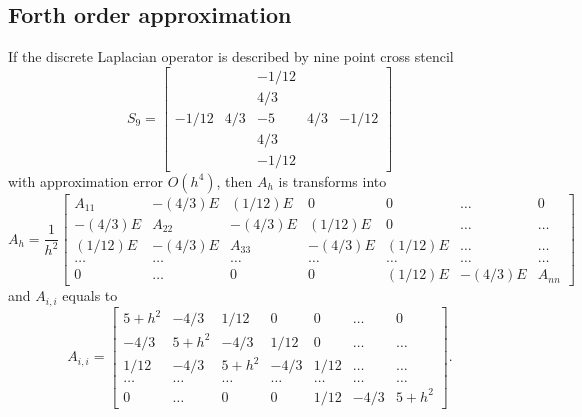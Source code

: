 \documentclass[11pt,a4paper,twoside]{article}
\begin{document}
\subsection{Forth order approximation}

If the discrete Laplacian operator is described by nine point cross stencil
\[
S_9 =
\begin{bmatrix}
          &       &  -1/12  & &  \\
          &       &  4/3     &   & \\
-1/12 & 4/3 &  -5       & 4/3 & -1/12\\
          &       &   4/3    &    &\\
          &       &  -1/12  &    &
\end{bmatrix}
\]
with approximation error $O(h^4)$, then $A_h$ is transforms into
\[
A_h = \frac{1}{h^2}
\begin{bmatrix}
    A_{11}            & -(4/3)E    &  (1/12)E       & 0                       & 0                      & \dots  & 0 \\
    -(4/3)E            & A_{22}    & -(4/3)E        &  (1/12)E         & 0                      & \dots & \dots   \\
    (1/12)E            & -(4/3)E   &      A_{33}  & -(4/3)E            & (1/12)E             & \dots  & \dots   \\
      \dots             & \dots       & \dots                       & \dots                &    \dots             &  \dots &    \dots  \\
     0                    & \dots        &  0                             &  0                     & (1/12)E             & -(4/3)E & A_{nn}
\end{bmatrix}
\]
and $A_{i,i}$ equals to
\[
A_{i,i} = 
\begin{bmatrix}
    5 + h^2  & -4/3          &  1/12       & 0         & 0                      & \dots  & 0 \\
    -4/3         & 5 + h^2   &  -4/3        &  1/12  & 0                    & \dots & \dots   \\
    1/12        &  -4/3         & 5 + h^2  &  -4/3   &  1/12              & \dots & \dots   \\
      \dots             & \dots                 & \dots                       & \dots                &    \dots             &  \dots &    \dots  \\
     0                    & \dots                 &  0                             &  0                     & 1/12                 & -4/3    & 5 + h^2
\end{bmatrix}.
\]
\end{document}
